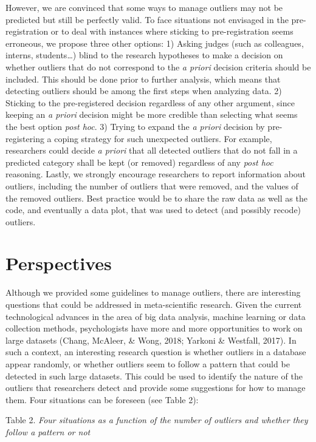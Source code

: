 \documentclass[man,floatsintext]{apa6}
\begin{document}
However, we are convinced that some ways to manage outliers may not be predicted but still be perfectly valid. To face situations not envisaged in the pre-registration or to deal with instances where sticking to pre-registration seems erroneous, we propose three other options:
1) Asking judges (such as colleagues, interns, students\ldots{}) blind to the research hypotheses to make a decision on whether outliers that do not correspond to the \emph{a priori} decision criteria should be included. This should be done prior to further analysis, which means that detecting outliers should be among the first steps when analyzing data.
2) Sticking to the pre-registered decision regardless of any other argument, since keeping an \emph{a priori} decision might be more credible than selecting what seems the best option \emph{post hoc}.
3) Trying to expand the \emph{a priori} decision by pre-registering a coping strategy for such unexpected outliers. For example, researchers could decide \emph{a priori} that all detected outliers that do not fall in a predicted category shall be kept (or removed) regardless of any \emph{post hoc} reasoning.
Lastly, we strongly encourage researchers to report information about outliers, including the number of outliers that were removed, and the values of the removed outliers. Best practice would be to share the raw data as well as the code, and eventually a data plot, that was used to detect (and possibly recode) outliers.

\hypertarget{perspectives}{%
\section{Perspectives}\label{perspectives}}

Although we provided some guidelines to manage outliers, there are interesting questions that could be addressed in meta-scientific research. Given the current technological advances in the area of big data analysis, machine learning or data collection methods, psychologists have more and more opportunities to work on large datasets (Chang, McAleer, \& Wong, 2018; Yarkoni \& Westfall, 2017). In such a context, an interesting research question is whether outliers in a database appear randomly, or whether outliers seem to follow a pattern that could be detected in such large datasets. This could be used to identify the nature of the outliers that researchers detect and provide some suggestions for how to manage them. Four situations can be foreseen (see Table 2):

Table 2.
\emph{Four situations as a function of the number of outliers and whether they follow a pattern or not}
\end{document}
